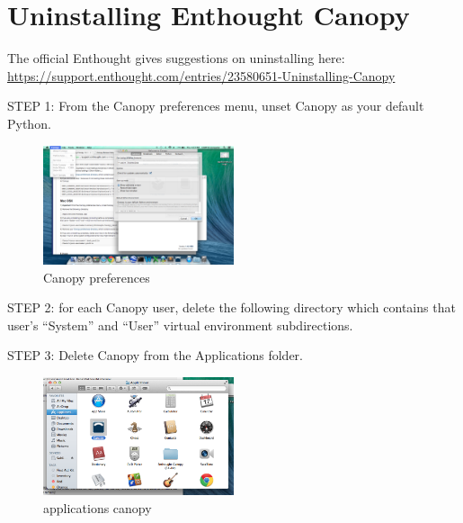 \documentclass[letterpaper,10pt]{article}
\begin{document}


\section{Uninstalling Enthought Canopy}

The official Enthought gives suggestions on uninstalling here: \url{https://support.enthought.com/entries/23580651-Uninstalling-Canopy}

STEP 1: From the Canopy preferences menu, unset Canopy as your default Python.

\begin{figure}[h!]
  \centering
  \includegraphics[width=0.5\textwidth]{images/canopy_preferences}
  \caption{Canopy preferences}
  \label{fig:canopy_preferences}
\end{figure}

STEP 2: for each Canopy user, delete the following directory which contains that user's ``System'' and ``User'' virtual environment subdirections.

STEP 3: Delete Canopy from the Applications folder. 

\begin{figure}[h!]
  \centering
  \includegraphics[width=0.5\textwidth]{images/applications_canopy}
  \caption{applications canopy}
  \label{fig:applications_canopy}
\end{figure}
\end{document}
